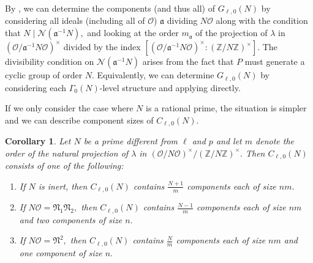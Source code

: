 \documentclass[11pt,a4paper]{amsart}
\theoremstyle{plain}
\newtheorem{cor}[thm]{Corollary}
\theoremstyle{definition}
\theoremstyle{remark}
\begin{document}
By , we can determine the components (and thus all) of $G_{\ell,0}(N)$ by considering all ideals (including all of $\mathcal{O}$) $\mathfrak{a}$ dividing $N \mathcal{O}$ along with the condition that $N \mid \mathcal{N}(\mathfrak{a}^{-1}N),$ and looking at the order $m_{\mathfrak{a}}$ of the projection of $\lambda$ in $(\mathcal{O}/\mathfrak{a}^{-1}N \mathcal{O})^{\times}$ divided by the index $[(\mathcal{O}/\mathfrak{a}^{-1}N \mathcal{O})^{\times} : (\mathbb{Z}/N \mathbb{Z})^{\times}].$ The divisibility condition on $\mathcal{N}(\mathfrak{a}^{-1}N)$ arises from the fact that $P$ must generate a cyclic group of order $N.$ Equivalently, we can determine $G_{\ell,0}(N)$ by considering each $\Gamma_0(N)$-level structure and applying  directly.

If we only consider the case where $N$ is a rational prime, the situation is simpler and we can describe component sizes of $C_{\ell,0}(N).$
\begin{cor}\label{cor:crater-structure-0}
  Let $N$ be a prime different from $\ell$ and $p$ and let $m$ denote the order of the natural projection of $\lambda$ in $(\mathcal{O}/N\mathcal{O})^{\times}/(\mathbb{Z}/N \mathbb{Z})^{\times}.$ Then $C_{\ell,0}(N)$ consists of one of the following:
  \begin{enumerate}[label=(\roman*)]
  \item If $N$ is inert, then $C_{\ell,0}(N)$ contains $\frac{N+1}{m}$ components each of size $nm.$
  \item If $N\mathcal{O} = \mathfrak{N}_1 \mathfrak{N}_2,$ then $C_{\ell,0}(N)$ contains $\frac{N-1}{m}$ components each of size $nm$ and two components of size $n.$
  \item If $N\mathcal{O} = \mathfrak{N}^2,$ then $C_{\ell,0}(N)$ contains $\frac{N}{m}$ components each of size $nm$ and one component of size $n.$
  \end{enumerate}
\end{cor}
\end{document}
